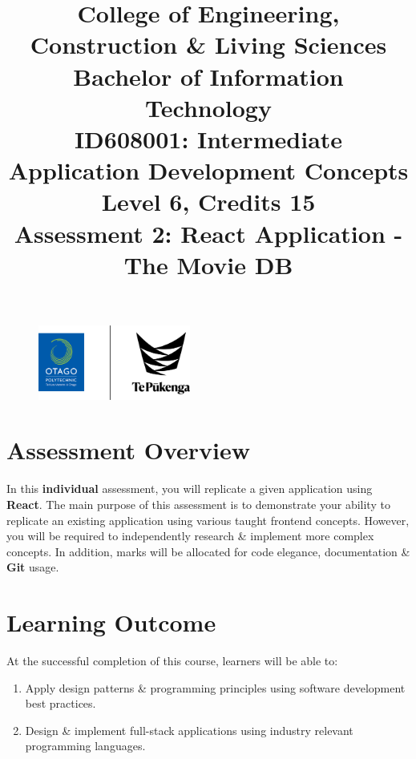 \documentclass{article}
\author{}
\begin{document}
\begin{figure}
	\centering
	\includegraphics[width=50mm]{../../resources/img/logo.png}
\end{figure}

\title{College of Engineering, Construction \& Living Sciences\\Bachelor of Information Technology\\ID608001: Intermediate Application Development Concepts\\Level 6, Credits 15\\\textbf{Assessment 2: React Application - The Movie DB}}
\date{}
\maketitle

\section*{Assessment Overview}
In this \textbf{individual} assessment, you will replicate a given application using \textbf{React}. The main purpose of this assessment is to demonstrate your ability to replicate an existing application using various taught frontend concepts. However, you will be required to independently research \& implement more complex concepts. In addition, marks will be allocated for code elegance, documentation \& \textbf{Git} usage.

\section*{Learning Outcome}
At the successful completion of this course, learners will be able to:
\begin{enumerate}
	\item Apply design patterns \& programming principles using software development best practices.
	\item Design \& implement full-stack applications using industry relevant programming languages.
\end{enumerate}
\end{document}
